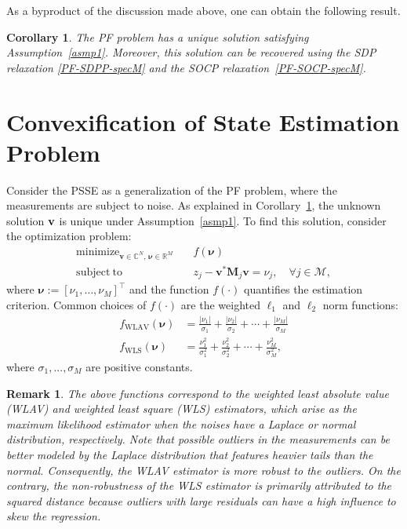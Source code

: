 \documentclass[journal,twoside]{IEEEtran}
\newtheorem{corollary}{Corollary}
\newtheorem{remark}{Remark}
\newcommand{\st}{\mathrm{subject~to}}
\newcommand{\bv}{\mathbf{v}}
\newcommand{\bM}{\mathbf{M}}
\newcommand{\bSigma}{\bm{\Sigma}}
\newcommand{\bnu}{\bm{\nu}}
\newcommand{\cM}{{\mathcal M}}
\DeclareMathOperator*{\mini}{\mathrm{minimize}}
\begin{document}
As a byproduct of the discussion made above, one can obtain the following result.

\begin{corollary}
\label{cor:c2}
The PF problem has a unique solution satisfying  Assumption~\ref{asmp1}. Moreover, this solution can be recovered using the SDP relaxation \eqref{PF-SDPP-specM} and the  SOCP relaxation~\eqref{PF-SOCP-specM}.
\end{corollary}






\vspace{-2mm}
\section{Convexification of State Estimation Problem}

Consider the PSSE as a generalization of the PF problem, where  the measurements are subject to noise. As explained in Corollary~\ref{cor:c2}, the unknown solution $\bold v$ is unique under Assumption~\ref{asmp1}.
To find this solution,  consider the optimization problem:
\begin{subequations}\label{prob:PSSE2}
\begin{align}
\mini_{\bv \in \mathbb{C}^N,\, \bnu \in \mathbb{R}^M}\quad &f(\bnu) \\
\st\quad  &z_j - \bv^{*}\bM_j\bv = \nu_j,\quad \forall j\in \cM, \label{PSSE2:constraint}
\end{align}
\end{subequations}
where $\bnu:=[\nu_1,\ldots,\nu_M]^{\top}$ and the function $f(\cdot)$ quantifies the estimation criterion.
Common choices of $f(\cdot)$ are the weighted $\ell_1$ and $\ell_2$ norm functions:
\begin{align}
f_{\mathrm{WLAV}}(\bnu)  & = \frac{|\nu_1|}{\sigma_1} + \frac{|\nu_2|}{\sigma_2} + \cdots + \frac{|\nu_M|}{\sigma_M}\\
f_{\mathrm{WLS}}(\bnu)  & = \frac{\nu_1^2}{\sigma_1^2} + \frac{\nu_2^2}{\sigma_2^2} + \cdots + \frac{\nu_M^2}{\sigma_M^2},
\end{align}
where $\sigma_1,...,\sigma_M$ are positive constants. 


\begin{remark}
The above functions correspond to the weighted least absolute value (WLAV) and weighted least square (WLS) estimators, which arise as the maximum likelihood estimator when the noises have a Laplace or normal distribution, respectively. Note that possible outliers in the measurements can be better modeled by the Laplace distribution that features heavier tails than the normal. Consequently, the WLAV estimator is more robust to the outliers. On the contrary, the non-robustness of the WLS estimator is primarily attributed to the squared distance because outliers with large residuals can have a high influence to skew the regression.
\end{remark}
\end{document}
